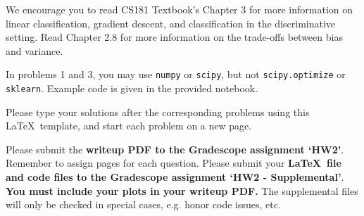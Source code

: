 \documentclass[submit]{harvardml}
\begin{document}
We encourage you to read CS181 Textbook's Chapter 3 for more
information on linear classification, gradient descent, and
classification in the discriminative setting. Read Chapter 2.8 for
more information on the trade-offs between bias and variance.

In problems 1 and 3, you may use \texttt{numpy} or \texttt{scipy}, but
not \texttt{scipy.optimize} or \texttt{sklearn}. Example code is given
in the provided notebook.

Please type your solutions after the corresponding problems using this
\LaTeX\ template, and start each problem on a new page.

Please submit the \textbf{writeup PDF to the Gradescope assignment
  `HW2'}. Remember to assign pages for each question.  Please submit
your \textbf{\LaTeX\ file and code files to the Gradescope assignment
  `HW2 - Supplemental'}. \textbf{You must include your plots in your
  writeup PDF. } The supplemental files will only be checked in
special cases, e.g. honor code issues, etc.


\end{document}

